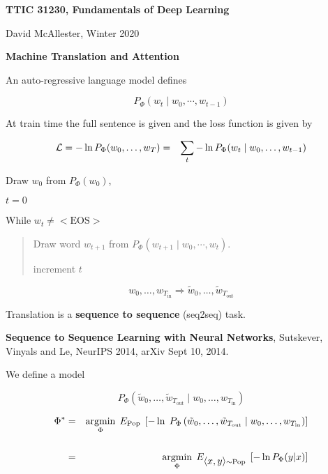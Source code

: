 




{\Huge

  \centerline{\bf TTIC 31230, Fundamentals of Deep Learning}
  \bigskip
  \centerline{David McAllester, Winter 2020}
  \vfill
  \centerline{\bf Machine Translation and Attention}


An auto-regressive language model defines

\vfill
$$P_\Phi(w_t\;|\;w_0,\cdots,w_{t-1})$$


At train time the full sentence is given and the loss function is given by

\begin{eqnarray*}
{\cal L} = -\ln P_\Phi(w_0,\ldots,w_T) & = & \sum_t -\ln P_\Phi(w_t\;|\;w_0,\ldots,w_{t-1}) \\
\end{eqnarray*}


Draw $w_0$ from $P_\Phi(w_0)$,

\bigskip
$t = 0$

\bigskip
While $w_t \not = \mathrm{<EOS>}$

\begin{quotation}
Draw word $w_{t+1}$ from $P_\Phi(w_{t+1}\;|\;w_0,\cdots,w_t)$.

\bigskip
increment $t$
\end{quotation}


$$w_0,\ldots,w_{T_{\mathrm{in}}} \Rightarrow \tilde{w}_0,\ldots,\tilde{w}_{T_{\mathrm{out}}}$$

\vfill
Translation is a {\bf sequence to sequence} (seq2seq) task.

\vfill
{\bf Sequence to Sequence Learning with Neural Networks}, Sutskever, Vinyals and Le, NeurIPS 2014, arXiv Sept 10, 2014.


\vfill
We define a model

\vfill
$$P_\Phi\left(\tilde{w}_0,\ldots,\tilde{w}_{T_{\mathrm{out}}}\;|\; w_0,\ldots,w_{T_{\mathrm{in}}}\right)$$

\vfill
\begin{eqnarray*}
\Phi^*  & = & \operatorname*{argmin}_\Phi\; E_{\mathrm{Pop}} \;\left[-\ln\;P_\Phi\left(\tilde{w}_0,\ldots,\tilde{w}_{T_{\mathrm{out}}}\;|\; w_0,\ldots,w_{T_{\mathrm{in}}}\right)\right] \\
\\
& = & \operatorname*{argmin}_\Phi \; E_{{\mbox{$\langle x,y\rangle$}} \sim \mathrm{Pop}} \; \left[-\ln P_\Phi(y|x)\right]
\end{eqnarray*}

}
